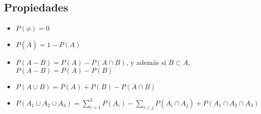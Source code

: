 \documentclass{./Probabilidad.tex}
\begin{document}
\subsection{Propiedades}
\begin{itemize}
	\item $P(\phi)=0$
	\item $P(\bar{A})=1-P(A)$
	\item $P(A-B)=P(A)-P(A \cap B)$, y además si $B \subset A$, $P(A-B)=P(A)-P(B)$
	\item $P(A \cup B)=P(A)+P(B)-P(A \cap B)$
	\item $P(A_{1}\cup A_{2}\cup A_{3})=\sum_{i=1}^3P(A_{i})-\sum_{i<j}P(A_{i}\cap A_{j})+P(A_{1}\cap A_{2}\cap A_{3})$
\end{itemize}
\end{document}
